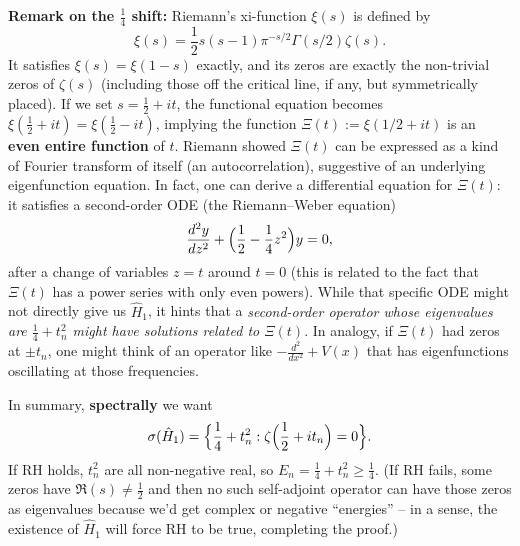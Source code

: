 \documentclass[12pt]{article}
\theoremstyle{plain}
\theoremstyle{definition}
\begin{document}
\textbf{Remark on the \(\frac{1}{4}\) shift:} Riemann's xi-function \(\xi(s)\) is defined by
\[
\xi(s) = \frac{1}{2}s(s-1)\pi^{-s/2}\Gamma(s/2)\zeta(s).
\]
It satisfies \(\xi(s) = \xi(1-s)\) exactly, and its zeros are exactly the non-trivial zeros of \(\zeta(s)\) (including those off the critical line, if any, but symmetrically placed). If we set \(s = \frac{1}{2} + i t\), the functional equation becomes \(\xi(\frac{1}{2}+it) = \xi(\frac{1}{2}-it)\), implying the function \(\Xi(t) := \xi(1/2 + it)\) is an \textbf{even entire function} of \(t\). Riemann showed \(\Xi(t)\) can be expressed as a kind of Fourier transform of itself (an autocorrelation), suggestive of an underlying eigenfunction equation. In fact, one can derive a differential equation for \(\Xi(t)\): it satisfies a second-order ODE (the Riemann--Weber equation) 
\[
\frac{d^2y}{dz^2} + \Bigl(\frac{1}{2} - \frac{1}{4}z^2\Bigr)y = 0,
\]
after a change of variables \(z = t\) around \(t=0\) (this is related to the fact that \(\Xi(t)\) has a power series with only even powers). While that specific ODE might not directly give us \(\hat{H}_1\), it hints that a \emph{second-order operator whose eigenvalues are \(\frac{1}{4} + t_n^2\) might have solutions related to \(\Xi(t)\)}. In analogy, if \(\Xi(t)\) had zeros at \(\pm t_n\), one might think of an operator like \(-\frac{d^2}{dx^2} + V(x)\) that has eigenfunctions oscillating at those frequencies.

In summary, \textbf{spectrally} we want
\[
\sigma(\hat{H}_1) = \Bigl\{\frac{1}{4} + t_n^2: \zeta\Bigl(\frac{1}{2} + it_n\Bigr)=0\Bigr\}.
\]
If RH holds, \(t_n^2\) are all non-negative real, so \(E_n = \frac{1}{4} + t_n^2 \ge \frac{1}{4}\). (If RH fails, some zeros have \(\Re(s)\ne \frac{1}{2}\) and then no such self-adjoint operator can have those zeros as eigenvalues because we'd get complex or negative ``energies'' -- in a sense, the existence of \(\hat{H}_1\) will force RH to be true, completing the proof.)
\end{document}
